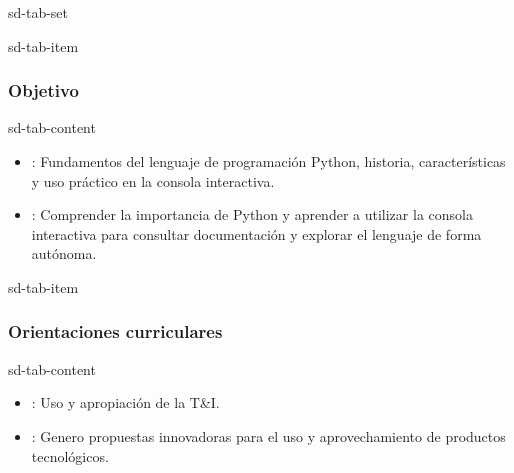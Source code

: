 \documentclass[letterpaper,10pt,spanish]{sphinxmanual}
\begin{document}
\begin{sphinxuseclass}{sd-tab-set}
\begin{sphinxuseclass}{sd-tab-item}\subsubsection*{Objetivo}

\begin{sphinxuseclass}{sd-tab-content}
\sphinxAtStartPar
{}
\begin{itemize}
\item {} 
\sphinxAtStartPar
{}: Fundamentos del lenguaje de programación Python, historia, características y uso práctico en la consola interactiva.

\item {} 
\sphinxAtStartPar
{}: Comprender la importancia de Python y aprender a utilizar la consola interactiva para consultar documentación y explorar el lenguaje de forma autónoma.

\end{itemize}

\end{sphinxuseclass}
\end{sphinxuseclass}
\begin{sphinxuseclass}{sd-tab-item}\subsubsection*{Orientaciones curriculares}

\begin{sphinxuseclass}{sd-tab-content}\begin{itemize}
\item {} 
\sphinxAtStartPar
{}: Uso y apropiación de la T\&I.

\item {} 
\sphinxAtStartPar
{}: Genero propuestas innovadoras para el uso y aprovechamiento de productos tecnológicos.


\end{itemize}
\end{sphinxuseclass}
\end{sphinxuseclass}
\end{sphinxuseclass}
\end{document}
